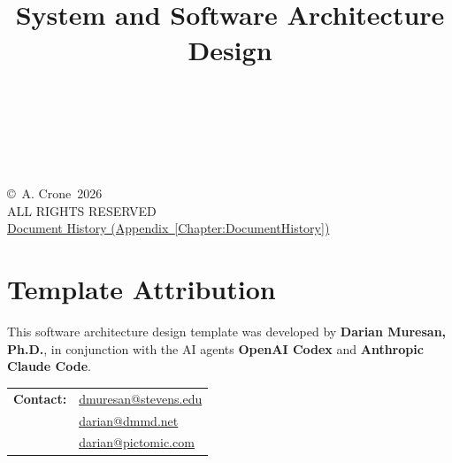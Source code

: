 \title{\ProjectName\\[0.5em]\large System and Software Architecture Design\\[1.5em]\normalsize\VERSION\\\DocumentStatus}
\author{\DocumentOwner\\\Organization}
\conferraldate{}{\DocumentDate}
\maketitle

\begin{copyrightpage}
\copyright\ A. Crone\ 2026 \\
ALL RIGHTS RESERVED \\[0.2in]
\hyperref[Chapter:DocumentHistory]{Document History (Appendix~\ref*{Chapter:DocumentHistory})}
\end{copyrightpage}

\cleardoublepage
{}
\chapter*{Template Attribution}

This software architecture design template was developed by
\textbf{Darian Muresan, Ph.D.}, in conjunction with the AI agents
\textbf{OpenAI Codex} and \textbf{Anthropic Claude Code}.

\begin{tabularx}{\linewidth}{@{}L{3.0cm}Y@{}}
\textbf{Contact:} & \href{mailto:dmuresan@stevens.edu}{dmuresan@stevens.edu}\\
& \href{mailto:darian@dmmd.net}{darian@dmmd.net}\\
& \href{mailto:darian@pictomic.com}{darian@pictomic.com}
\end{tabularx}

\clearpage
\begin{abstract}
  
\end{abstract}

\contentspage
\tablelistpage
\figurelistpage
